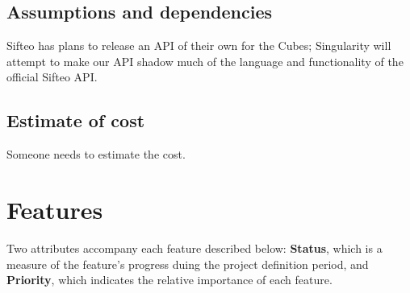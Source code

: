 \documentclass[12pt]{article}
\begin{document}
              \subsection{Assumptions and dependencies}
              Sifteo has plans to release an API of their own for the Cubes; Singularity will attempt to make our API shadow much of the language and functionality of the official Sifteo API. 

              \subsection{Estimate of cost}
              Someone needs to estimate the cost.

\clearpage

\section{Features}
Two attributes accompany each feature described below: \textbf{Status}, which is a measure of the feature's progress duing the project definition period, and \textbf{Priority}, which indicates the relative importance of each feature.
\end{document}
